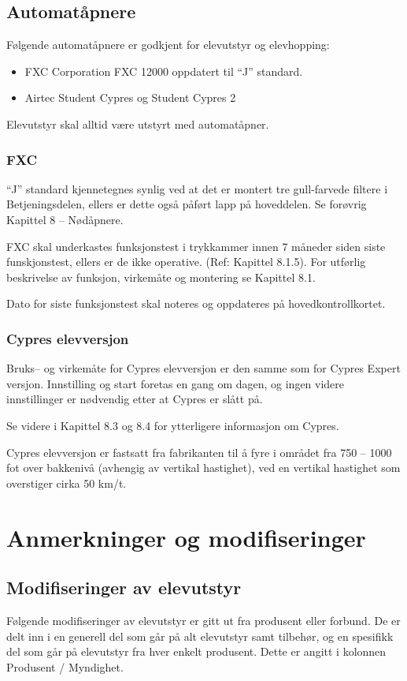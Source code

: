 \subsection{Automatåpnere}
Følgende automatåpnere er godkjent for elevutstyr og elevhopping:
\begin{itemize}
	\item FXC Corporation FXC 12000 oppdatert til ``J'' standard.
	\item Airtec Student Cypres og Student Cypres 2
\end{itemize}

Elevutstyr skal alltid være utstyrt med automatåpner.

\subsubsection{FXC}
``J'' standard kjennetegnes synlig ved at det er montert tre gull-farvede filtere i Betjeningsdelen, ellers er dette også påført lapp på hoveddelen. Se forøvrig Kapittel 8 – Nødåpnere.

FXC skal underkastes funksjonstest i trykkammer innen 7 måneder siden siste funskjonstest, ellers er de ikke operative. (Ref: Kapittel 8.1.5). For utførlig beskrivelse av funksjon, virkemåte og montering se Kapittel 8.1.

Dato for siste funksjonstest skal noteres og oppdateres på hovedkontrollkortet.

\subsubsection{Cypres elevversjon}
Bruks– og virkemåte for Cypres elevversjon er den samme som for Cypres Expert versjon. Innstilling og start foretas en gang om dagen, og ingen videre innstillinger er nødvendig etter at Cypres er slått på.

Se videre i Kapittel 8.3 og 8.4 for ytterligere informasjon om Cypres.

Cypres elevversjon er fastsatt fra fabrikanten til å fyre i området fra 750 – 1000 fot over bakkenivå (avhengig av vertikal hastighet), ved en vertikal hastighet som overstiger cirka 50 km/t.

\section{Anmerkninger og modifiseringer}
\subsection{Modifiseringer av elevutstyr}
Følgende modifiseringer av elevutstyr er gitt ut fra produsent eller forbund. De er delt inn i en generell del som går på alt elevutstyr samt tilbehør, og en spesifikk del som går på elevutstyr fra hver enkelt produsent. Dette er angitt i kolonnen Produsent / Myndighet.

